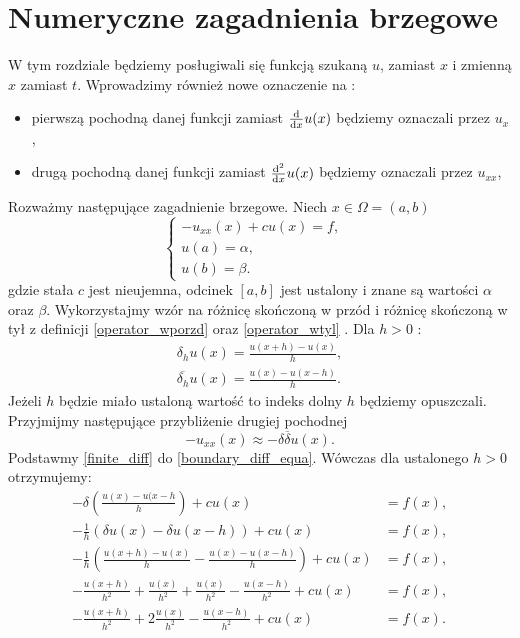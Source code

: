 \documentclass[12pt,a4paper]{report}
\begin{document}
\chapter{Numeryczne zagadnienia brzegowe}
W tym rozdziale będziemy posługiwali się funkcją szukaną $u$, zamiast $x$ i zmienną $x$ zamiast $t$. Wprowadzimy również nowe oznaczenie na :
\begin{itemize}
\item pierwszą pochodną danej funkcji zamiast $\ddx{x} u(x) $ będziemy oznaczali przez $u_{x}$,
\item drugą pochodną danej funkcji zamiast $\ddx[^2]{x} u(x)$ będziemy oznaczali przez $u_{xx}$,
\end{itemize}
Rozważmy następujące zagadnienie brzegowe. Niech $ x \in \Omega = (a,b) $
\begin{equation} \label{boundary_diff_equa}
\left\{ \begin{array}{ll}
-u_{xx}(x) + cu(x) =f, & \\
u(a) = \alpha, & \\
u(b) = \beta. & 
\end{array} \right.
\end{equation}
gdzie stała $c$ jest nieujemna, odcinek $ [a,b]$ jest ustalony i znane są wartości $\alpha$ oraz $\beta$. Wykorzystajmy wzór na różnicę skończoną w przód i różnicę skończoną w tył z definicji \ref{operator_wporzd} oraz \ref{operator_wtyl} . Dla $h>0$ :
\begin{equation} \label{finite_diff}
\begin{array}{c}
\delta_h u(x) = \frac{u(x+h) - u(x)}{h},   \\
\overline{\delta_h} u(x) = \frac{u(x)-u(x-h)}{h} . 
\end{array}
\end{equation}
Jeżeli $h$ będzie miało ustaloną wartość to indeks dolny $h$ będziemy opuszczali. Przyjmijmy następujące przybliżenie drugiej pochodnej
$$
-u_{xx}(x) \approx -\delta \overline{\delta} u(x).
$$
Podstawmy \eqref{finite_diff} do \eqref{boundary_diff_equa}. Wówczas dla ustalonego $h>0$ otrzymujemy: 
\begin{equation}
\begin{array}{rl}
-\delta (\frac{u(x)-u(x-h}{h}) + cu(x) &= f(x),  \\
- \frac{1}{h} (\delta u(x) - \delta u(x-h) ) + cu(x) &= f(x), \\
-\frac{1}{h} (\frac{u(x+h)-u(x)}{h} - \frac{u(x)-u(x-h)}{h}) + cu(x) &= f(x), \\
-\frac{u(x+h)}{h^2} + \frac{u(x)}{h^2} + \frac{u(x)}{h^2} - \frac{u(x-h)}{h^2} +cu(x)& = f(x), \\
-\frac{u(x+h)}{h^2} + 2\frac{u(x)}{h^2} - \frac{u(x-h)}{h^2} +cu(x) &= f(x) .
\end{array}
\end{equation}
\end{document}
